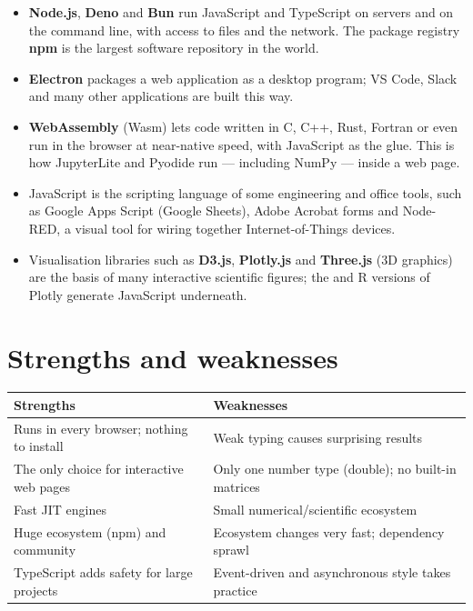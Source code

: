 \begin{itemize}
\item \textbf{Node.js}, \textbf{Deno} and \textbf{Bun} run JavaScript and TypeScript on
  servers and on the command line, with access to files and the network. The package
  registry \textbf{npm} is the largest software repository in the world.
\item \textbf{Electron} packages a web application as a desktop program; VS Code, Slack
  and many other applications are built this way.
\item \textbf{WebAssembly} (Wasm) lets code written in C, C++, Rust, Fortran or even \py
  run in the browser at near-native speed, with JavaScript as the glue. This is how
  JupyterLite and Pyodide run \py --- including NumPy --- inside a web page.
\item JavaScript is the scripting language of some engineering and office tools, such as
  Google Apps Script (Google Sheets), Adobe Acrobat forms and Node-RED, a visual tool for
  wiring together Internet-of-Things devices.
\item Visualisation libraries such as \textbf{D3.js}, \textbf{Plotly.js} and
  \textbf{Three.js} (3D graphics) are the basis of many interactive scientific figures; the
  \py and R versions of Plotly generate JavaScript underneath.
\end{itemize}

\section{Strengths and weaknesses}

\begin{center}
\small
\begin{tabularx}{\linewidth}{@{}>{\raggedright\arraybackslash}X>{\raggedright\arraybackslash}X@{}}
\toprule
\textbf{Strengths} & \textbf{Weaknesses}\\
\midrule
Runs in every browser; nothing to install & Weak typing causes surprising results\\
The only choice for interactive web pages & Only one number type (double); no built-in matrices\\
Fast JIT engines & Small numerical/scientific ecosystem\\
Huge ecosystem (npm) and community & Ecosystem changes very fast; dependency sprawl\\
TypeScript adds safety for large projects & Event-driven and asynchronous style takes practice\\
\bottomrule
\end{tabularx}
\end{center}

